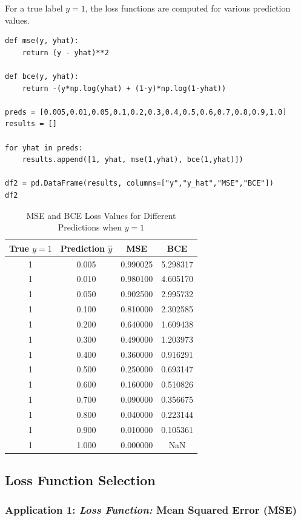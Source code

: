 \documentclass[12pt]{article}
\begin{document}
For a true label $y = 1$, the loss functions are computed for various prediction values.

\begin{lstlisting}[caption={Loss Function Calculation}]
def mse(y, yhat):
    return (y - yhat)**2

def bce(y, yhat):
    return -(y*np.log(yhat) + (1-y)*np.log(1-yhat))

preds = [0.005,0.01,0.05,0.1,0.2,0.3,0.4,0.5,0.6,0.7,0.8,0.9,1.0]
results = []

for yhat in preds:
    results.append([1, yhat, mse(1,yhat), bce(1,yhat)])

df2 = pd.DataFrame(results, columns=["y","y_hat","MSE","BCE"])
df2
\end{lstlisting}

\begin{table}[H]
\centering
\caption{MSE and BCE Loss Values for Different Predictions when $y = 1$}
\label{tab:loss_comparison}
\begin{tabular}{@{}cccc@{}}
\toprule
True $y = 1$ & Prediction $\hat{y}$ & MSE & BCE \\
\midrule
1 & 0.005 & 0.990025 & 5.298317 \\
1 & 0.010 & 0.980100 & 4.605170 \\
1 & 0.050 & 0.902500 & 2.995732 \\
1 & 0.100 & 0.810000 & 2.302585 \\
1 & 0.200 & 0.640000 & 1.609438 \\
1 & 0.300 & 0.490000 & 1.203973 \\
1 & 0.400 & 0.360000 & 0.916291 \\
1 & 0.500 & 0.250000 & 0.693147 \\
1 & 0.600 & 0.160000 & 0.510826 \\
1 & 0.700 & 0.090000 & 0.356675 \\
1 & 0.800 & 0.040000 & 0.223144 \\
1 & 0.900 & 0.010000 & 0.105361 \\
1 & 1.000 & 0.000000 & NaN \\
\bottomrule
\end{tabular}
\end{table}


\newpage

\subsection{Loss Function Selection}

\subsubsection{Application 1: \textit{Loss Function:} Mean Squared Error (MSE)}
\end{document}
